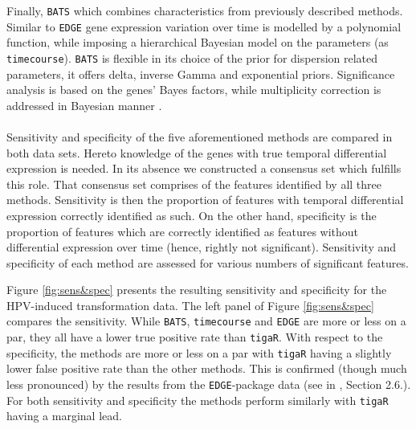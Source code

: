 Finally, {\tt BATS} \cite{Angelini2007} which combines characteristics from previously described methods. Similar to {\tt EDGE} gene expression variation over time is modelled by a polynomial function, while imposing a hierarchical Bayesian model on the parameters (as {\tt timecourse}). {\tt BATS} is flexible in its choice of the prior for dispersion related parameters, it offers delta, inverse Gamma and exponential priors. Significance analysis is based on the genes' Bayes factors, while multiplicity correction is addressed in Bayesian manner \cite{Abramovich2006}.
\\
\\
Sensitivity and specificity of the five aforementioned methods are compared in both data sets. Hereto knowledge of the genes with true temporal differential expression is needed. In its absence we constructed a consensus set which fulfills this role. That consensus set comprises of the features identified by all three methods. Sensitivity is then the proportion of features with temporal differential expression correctly identified as such. On the other hand, specificity is the proportion of features which are correctly identified as features without differential expression over time (hence, rightly not significant). Sensitivity and specificity of each method are assessed for various numbers of significant features.

Figure \ref{fig:sens&spec} presents the resulting sensitivity and specificity for the HPV-induced transformation data. The left panel of Figure \ref{fig:sens&spec} compares the sensitivity. While {\tt BATS}, {\tt timecourse} and {\tt EDGE} are more or less on a par, they all have a lower true positive rate than {\tt tigaR}. With respect to the specificity, the methods are more or less on a par with {\tt tigaR} having a slightly lower false positive rate than the other methods. This is confirmed (though much less pronounced) by the results from the {\tt EDGE}-package data (see in \cite{Miok2014}, Section 2.6.). For both sensitivity and specificity the methods perform similarly with {\tt tigaR} having a marginal lead.

